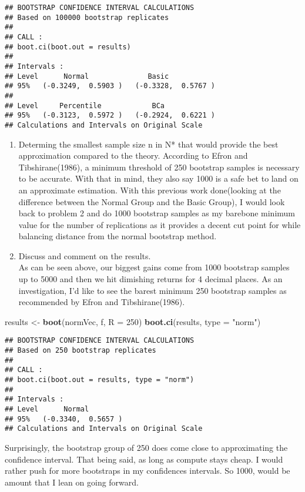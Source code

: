 \documentclass[]{article}
\newenvironment{Shaded}{\begin{snugshade}}{\end{snugshade}}
\newcommand{\KeywordTok}[1]{\textcolor[rgb]{0.13,0.29,0.53}{\textbf{#1}}}
\newcommand{\DataTypeTok}[1]{\textcolor[rgb]{0.13,0.29,0.53}{#1}}
\newcommand{\DecValTok}[1]{\textcolor[rgb]{0.00,0.00,0.81}{#1}}
\newcommand{\StringTok}[1]{\textcolor[rgb]{0.31,0.60,0.02}{#1}}
\newcommand{\NormalTok}[1]{#1}
\begin{document}
\begin{verbatim}
## BOOTSTRAP CONFIDENCE INTERVAL CALCULATIONS
## Based on 100000 bootstrap replicates
## 
## CALL : 
## boot.ci(boot.out = results)
## 
## Intervals : 
## Level      Normal              Basic         
## 95%   (-0.3249,  0.5903 )   (-0.3328,  0.5767 )  
## 
## Level     Percentile            BCa          
## 95%   (-0.3123,  0.5972 )   (-0.2924,  0.6221 )  
## Calculations and Intervals on Original Scale
\end{verbatim}

\begin{enumerate}
\def\labelenumi{\arabic{enumi})}
\setcounter{enumi}{2}
\item
  Determing the smallest sample size n in N* that would provide the best
  approximation compared to the theory. According to Efron and
  Tibshirane(1986), a minimum threshold of 250 bootstrap samples is
  necessary to be accurate. With that in mind, they also say 1000 is a
  safe bet to land on an approximate estimation. With this previous work
  done(looking at the difference between the Normal Group and the Basic
  Group), I would look back to problem 2 and do 1000 bootstrap samples
  as my barebone minimum value for the number of replications as it
  provides a decent cut point for while balancing distance from the
  normal bootstrap method.
\item
  Discuss and comment on the results.\\
  As can be seen above, our biggest gains come from 1000 bootstrap
  samples up to 5000 and then we hit dimishing returns for 4 decimal
  places. As an investigation, I'd like to see the barest minimum 250
  bootstrap samples as recommended by Efron and Tibshirane(1986).
\end{enumerate}

\begin{Shaded}
\begin{Highlighting}[]
\NormalTok{results <-}\StringTok{ }\KeywordTok{boot}\NormalTok{(normVec, f, }\DataTypeTok{R =} \DecValTok{250}\NormalTok{)}
\KeywordTok{boot.ci}\NormalTok{(results, }\DataTypeTok{type =} \StringTok{"norm"}\NormalTok{)}
\end{Highlighting}
\end{Shaded}

\begin{verbatim}
## BOOTSTRAP CONFIDENCE INTERVAL CALCULATIONS
## Based on 250 bootstrap replicates
## 
## CALL : 
## boot.ci(boot.out = results, type = "norm")
## 
## Intervals : 
## Level      Normal        
## 95%   (-0.3340,  0.5657 )  
## Calculations and Intervals on Original Scale
\end{verbatim}

Surprisingly, the bootstrap group of 250 does come close to
approximating the confidence interval. That being said, as long as
compute stays cheap. I would rather push for more bootstraps in my
confidences intervals. So 1000, would be amount that I lean on going
forward.
\end{document}
